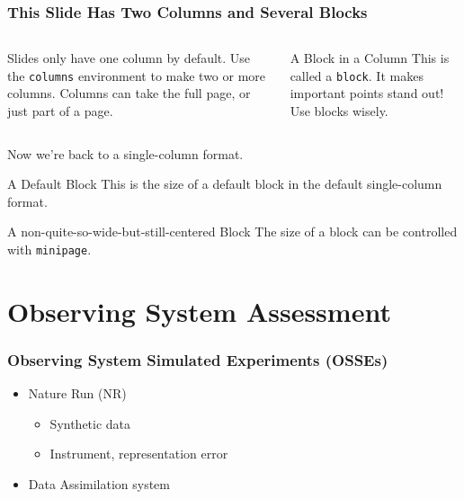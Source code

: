 \documentclass[10pt, aspectratio=169]{oden_beamer}
\begin{document}
\begin{frame} %
\frametitle{This Slide Has Two Columns and Several Blocks}
\begin{columns}
\begin{column}{.49\textwidth}
    Slides only have one column by default.
    Use the \texttt{columns} environment to make two or more columns.
    Columns can take the full page, or just part of a page.
\end{column}
%
\begin{column}{.49\textwidth}
    \begin{block}{A Block in a Column}
        This is called a \texttt{block}.
        It makes important points stand out!
        Use blocks wisely.
    \end{block}
\end{column}
\end{columns}

\vspace{.5cm}
Now we're back to a single-column format.

\pause %

\begin{block}{A Default Block}
     This is the size of a default block in the default single-column format.
\end{block}

\begin{center}
\begin{minipage}{.9\textwidth}
\begin{block}{A non-quite-so-wide-but-still-centered Block}
    The size of a block can be controlled with \texttt{minipage}.
\end{block}
\end{minipage}
\end{center}
\end{frame}


\section{Observing System Assessment}
\begin{frame}
\frametitle{Observing System Simulated Experiments (OSSEs)}
\begin{itemize}
    \item Nature Run (NR)
    \begin{itemize}
        \item Synthetic data
        \item Instrument, representation error
    \end{itemize}
    \item Data Assimilation system
\end{itemize}
\end{frame}
\end{document}
